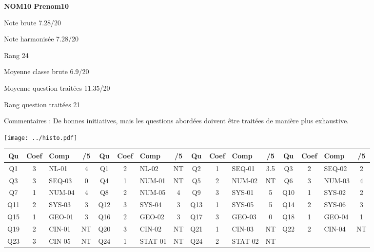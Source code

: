 \begin{minipage}[c]{.45\linewidth} 
\Large \textbf{\textsf{NOM10 Prenom10}} 
 
 \normalsize Note brute 7.28/20 
 
 \normalsize Note harmonisée 7.28/20 
 
Rang 24
 
Moyenne classe brute 6.9/20 
 
Moyenne question traitées 11.35/20 
 
Rang question traitées 21 
 
Commentaires : 
De bonnes initiatives, mais les questions abordées doivent être traitées de manière plus exhaustive.  
\end{minipage}\hfill 
\begin{minipage}[c]{.45\linewidth}  
\begin{center}
\texttt{[image: ../histo.pdf]} 
\end{center}
\end{minipage}
\footnotesize 
\begin{center} 
\begin{tabular}{|c|c|m{1cm}|c||c|c|m{1cm}|c||c|c|m{1cm}|c||c|c|m{1cm}|c|} 
\hline \textbf{Qu} & \textbf{Coef} & \textbf{Comp} & \textbf{/5} & \textbf{Qu} & \textbf{Coef} & \textbf{Comp} & \textbf{/5} & \textbf{Qu} & \textbf{Coef} & \textbf{Comp} & \textbf{/5} & \textbf{Qu} & \textbf{Coef} & \textbf{Comp} & \textbf{/5} \\ 
\hline 
\hline 
Q1 & 3 & NL-01 & 4 & Q1 & 2 & NL-02 & NT & Q2 & 1 & SEQ-01 & 3.5 & Q3 & 2 & SEQ-02 & 2 \\ \hline 
 
Q3 & 3 & SEQ-03 & 0 & Q4 & 1 & NUM-01 & NT & Q5 & 2 & NUM-02 & NT & Q6 & 3 & NUM-03 & 4 \\ \hline 
 
Q7 & 1 & NUM-04 & 4 & Q8 & 2 & NUM-05 & 4 & Q9 & 3 & SYS-01 & 5 & Q10 & 1 & SYS-02 & 2 \\ \hline 
 
Q11 & 2 & SYS-03 & 3 & Q12 & 3 & SYS-04 & 3 & Q13 & 1 & SYS-05 & 5 & Q14 & 2 & SYS-06 & 3 \\ \hline 
 
Q15 & 1 & GEO-01 & 3 & Q16 & 2 & GEO-02 & 3 & Q17 & 3 & GEO-03 & 0 & Q18 & 1 & GEO-04 & 1 \\ \hline 
 
Q19 & 2 & CIN-01 & NT & Q20 & 3 & CIN-02 & NT & Q21 & 1 & CIN-03 & NT & Q22 & 2 & CIN-04 & NT \\ \hline 
 
Q23 & 3 & CIN-05 & NT & Q24 & 1 & STAT-01 & NT & Q24 & 2 & STAT-02 & NT &  &  &  &  \\ \hline 
 
\end{tabular} 
\end{center} 
\normalsize 
 
